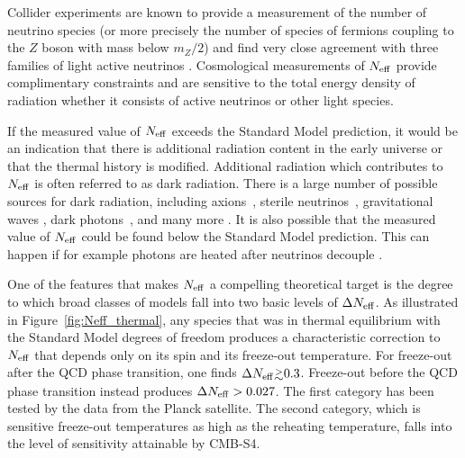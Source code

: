 Collider experiments are known to provide a measurement of the number of neutrino species (or more precisely the number of species of fermions coupling to the $Z$ boson with mass below $m_Z/2$) and find very close agreement with three families of light active neutrinos \cite{ALEPH:2005ab}.  Cosmological measurements of $N_{\rm eff}$ provide complimentary constraints and are sensitive to the total energy density of radiation whether it consists of active neutrinos or other light species.

If the measured value of $N_{\rm eff}$ exceeds the Standard Model prediction, it would be an indication that there is additional radiation content in the early universe or that the thermal history is modified.  Additional radiation which contributes to $N_{\rm eff}$ is often referred to as dark radiation.  There is a large number of possible sources for dark radiation, including axions~\cite{Brust:2013xpv,Salvio:2013iaa,Kawasaki:2015ofa,Baumann:2016wac}, sterile neutrinos~\cite{Abazajian:2001nj,Strumia:2006db,Boyarsky:2009ix}, gravitational waves \cite{Boyle:2007zx,Stewart:2007fu,Meerburg:2015zua}, dark photons~\cite{Ackerman:2008gi,Kaplan:2011yj,CyrRacine:2012fz}, and many more \cite{Cadamuro:2010cz,Weinberg:2013kea,Arkani-Hamed:2016rle}.  It is also possible that the measured value of $N_{\rm eff}$ could be found below the Standard Model prediction.  This can happen if for example photons are heated after neutrinos decouple \cite{Steigman:2013yua,Boehm:2013jpa}.

One of the features that makes $N_{\rm eff}$ a compelling theoretical target is the degree to which broad classes of models fall into two basic levels of $\Delta N_{\rm eff}$.  As illustrated in Figure~\ref{fig:Neff_thermal}, any species that was in thermal equilibrium with the Standard Model degrees of freedom produces a characteristic correction to $N_{\rm eff}$ that depends only on its spin and its freeze-out temperature.  For freeze-out after the QCD phase transition, one finds $\Delta \Neff \gtrsim 0.3$.  Freeze-out before the QCD phase transition instead produces $\Delta N_{\rm eff} > 0.027$.  The first category has been tested by the data from the Planck satellite.  The second category, which is sensitive freeze-out temperatures as high as the reheating temperature, falls into the level of sensitivity attainable by CMB-S4.

